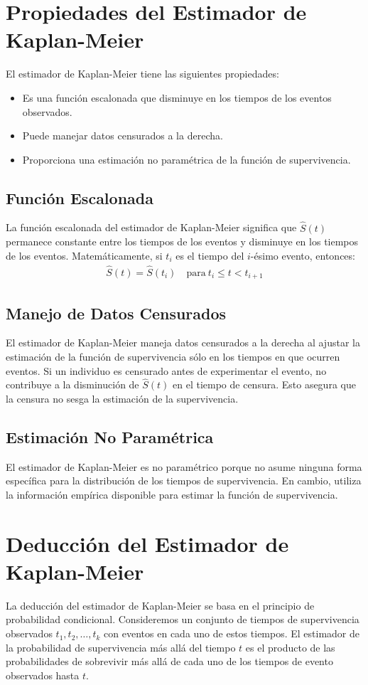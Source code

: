 \documentclass[a4paper]{report} %
\begin{document}
\section{Propiedades del Estimador de Kaplan-Meier}
El estimador de Kaplan-Meier tiene las siguientes propiedades:
\begin{itemize}
    \item Es una funci\'on escalonada que disminuye en los tiempos de los eventos observados.
    \item Puede manejar datos censurados a la derecha.
    \item Proporciona una estimaci\'on no param\'etrica de la funci\'on de supervivencia.
\end{itemize}

\subsection{Funci\'on Escalonada}
La funci\'on escalonada del estimador de Kaplan-Meier significa que $\hat{S}(t)$ permanece constante entre los tiempos de los eventos y disminuye en los tiempos de los eventos. Matem\'aticamente, si $t_i$ es el tiempo del $i$-\'esimo evento, entonces:
\begin{eqnarray*}
\hat{S}(t) = \hat{S}(t_i) \quad \text{para} \ t_i \leq t < t_{i+1}
\end{eqnarray*}

\subsection{Manejo de Datos Censurados}
El estimador de Kaplan-Meier maneja datos censurados a la derecha al ajustar la estimaci\'on de la funci\'on de supervivencia s\'olo en los tiempos en que ocurren eventos. Si un individuo es censurado antes de experimentar el evento, no contribuye a la disminuci\'on de $\hat{S}(t)$ en el tiempo de censura. Esto asegura que la censura no sesga la estimaci\'on de la supervivencia.

\subsection{Estimaci\'on No Param\'etrica}
El estimador de Kaplan-Meier es no param\'etrico porque no asume ninguna forma espec\'ifica para la distribuci\'on de los tiempos de supervivencia. En cambio, utiliza la informaci\'on emp\'irica disponible para estimar la funci\'on de supervivencia.

\section{Deducci\'on del Estimador de Kaplan-Meier}
La deducci\'on del estimador de Kaplan-Meier se basa en el principio de probabilidad condicional. Consideremos un conjunto de tiempos de supervivencia observados $t_1, t_2, \ldots, t_k$ con eventos en cada uno de estos tiempos. El estimador de la probabilidad de supervivencia m\'as all\'a del tiempo $t$ es el producto de las probabilidades de sobrevivir m\'as all\'a de cada uno de los tiempos de evento observados hasta $t$.
\end{document}
